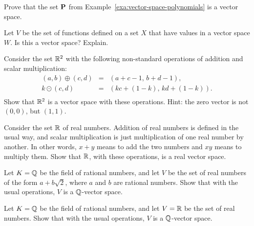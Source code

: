\begin{ex}
  Prove that the set $\mathbf{P}$ from
  Example~\ref{exa:vector-space-polynomials} is a vector space.
\end{ex}

\begin{ex}
  Let $V$ be the set of functions defined on a set $X$ that have
  values in a vector space $W$. Is this a vector space? Explain.
\end{ex}

\begin{ex}
  Consider the set $\mathbb{R}^2$ with the following non-standard operations
  of addition and scalar multiplication:
  \begin{equation*}
    \begin{array}{rcl}
      (a,b) \oplus (c,d) &=& (a+c-1,\, b+d-1), \\
      k \odot (c,d) &=& (kc + (1-k),\, kd + (1-k)). \\
    \end{array}
  \end{equation*}
  Show that $\mathbb{R}^2$ is a vector space with these operations. Hint: the
  zero vector is not $(0,0)$, but $(1,1)$.
\end{ex}

\begin{ex}
  Consider the set $\mathbb{R}$ of real numbers. Addition of real numbers is
  defined in the usual way, and scalar multiplication is just
  multiplication of one real number by another. In other words, $x+y$
  means to add the two numbers and $xy$ means to multiply them. Show
  that $\mathbb{R}$, with these operations, is a real vector space.
\end{ex}

\begin{ex}
  Let $K=\mathbb{Q}$ be the field of rational numbers, and let $V$ be the set
  of real numbers of the form $a+b\sqrt{2}$, where $a$ and $b$ are
  rational numbers. Show that with the usual operations, $V$ is a
  $\mathbb{Q}$-vector space.
\end{ex}

\begin{ex}
  Let $K=\mathbb{Q}$ be the field of rational numbers, and let $V=\mathbb{R}$ be the
  set of real numbers. Show that with the usual operations, $V$ is a
  $\mathbb{Q}$-vector space.
\end{ex}


